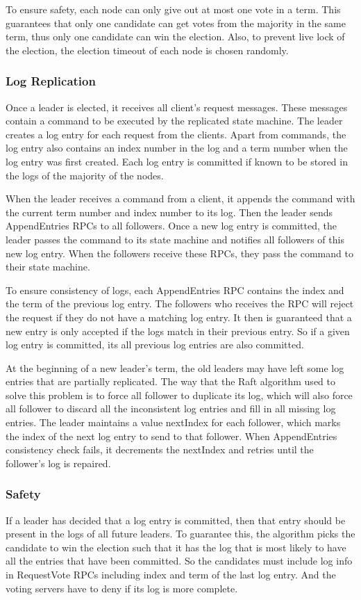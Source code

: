 \documentclass[12pt, a4paper]{article}
\begin{document}
  To ensure safety, each node can only give out at most one vote in a term. This guarantees that only one candidate can get votes from the majority in the same term, thus only one candidate can win the election. Also, to prevent live lock of the election, the election timeout of each node is chosen randomly.

  \subsubsection{Log Replication}
  Once a leader is elected, it receives all client's request messages. These messages contain a command to be executed by the replicated state machine. The leader creates a log entry for each request from the clients. Apart from commands, the log entry also contains an index number in the log and a term number when the log entry was first created. Each log entry is committed if known to be stored in the logs of the majority of the nodes.

  When the leader receives a command from a client, it appends the command with the current term number and index number to its log. Then the leader sends AppendEntries RPCs to all followers. Once a new log entry is committed, the leader passes the command to its state machine and notifies all followers of this new log entry. When the followers receive these RPCs, they pass the command to their state machine.

  To ensure consistency of logs, each AppendEntries RPC contains the index and the term of the previous log entry. The followers who receives the RPC will reject the request if they do not have a matching log entry. It then is guaranteed that a new entry is only accepted if the logs match in their previous entry. So if a given log entry is committed, its all previous log entries are also committed.

  At the beginning of a new leader's term, the old leaders may have left some log entries that are partially replicated. The way that the Raft algorithm used to solve this problem is to force all follower to duplicate its log, which will also force all follower to discard all the inconsistent log entries and fill in all missing log entries. The leader maintains a value nextIndex for each follower, which marks the index of the next log entry to send to that follower. When AppendEntries consistency check fails, it decrements the nextIndex and retries until the follower's log is repaired.

  \subsubsection{Safety}
  If a leader has decided that a log entry is committed, then that entry should be present in the logs of all future leaders\cite{conf/usenix/OngaroO14}. To guarantee this, the algorithm picks the candidate to win the election such that it has the log that is most likely to have all the entries that have been committed. So the candidates must include log info in RequestVote RPCs including index and term of the last log entry. And the voting servers have to deny if its log is more complete.
\end{document}
